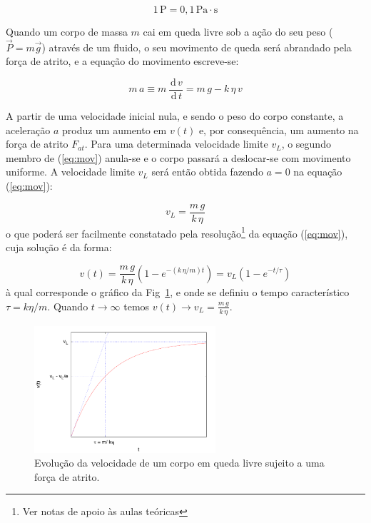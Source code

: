 \documentclass[a4paper,twoside,12pt]{article}      %
\newcommand{\ud}{\,\mathrm{d}}
\begin{document}
        \begin{equation*}
            1 \, \mathrm{P} = 0,1\, \mathrm{Pa}\cdot\mathrm{s}
        \end{equation*}

        Quando um corpo de massa $m$ cai em queda livre sob a ação do seu peso ($\vec{P}=m\vec{g}$) através de um fluido, o seu movimento de queda será abrandado pela força de atrito, e a equação do movimento escreve-se:

        \begin{equation}
            \label{eq:mov}
            m\,a \equiv m\, \frac{\ud\, v}{\ud\, t} =  m\,g - k  \, \eta \, v
        \end{equation}

        A partir de uma velocidade inicial nula, e sendo o peso do corpo constante, a aceleração $a$ produz um aumento  em $v(t)$ e, por consequência, um aumento na força de atrito $F_{at}$. Para uma determinada velocidade limite $v_L$, o segundo membro de (\ref{eq:mov}) anula-se e o corpo passará a deslocar-se com movimento uniforme. A velocidade limite $v_L$ será então obtida fazendo $a= 0$ na equação (\ref{eq:mov}):

        \begin{equation}
            \label{eq:vlimit}
            v_L = \frac{m\,g}{k  \, \eta}
        \end{equation}
        o que poderá ser facilmente constatado pela resolução\footnote{Ver notas de apoio às aulas teóricas} da equação (\ref{eq:mov}), cuja solução é da forma:

        \begin{equation}
            \label{eq:vlimita}
            v(t) = \frac{m\,g}{k  \, \eta} (1 - e^{- (k\,\eta / m) t}) = v_L (1-e^{-t/\tau})
        \end{equation}
        à qual corresponde o gráfico  da Fig~\ref{fig:vLim}, e onde se definiu o tempo característico $\tau=k\eta/m$. Quando $t \to \infty$ temos $v(t) \to v_L = \frac{m\,g}{k  \, \eta} $.



\begin{figure}[tb]
    \centering 
    \includegraphics[width=0.6\textwidth]{./plote}
    \caption{ Evolução da velocidade de um corpo em queda livre sujeito a uma força de atrito. \label{fig:vLim}} 
\end{figure}
\end{document}
